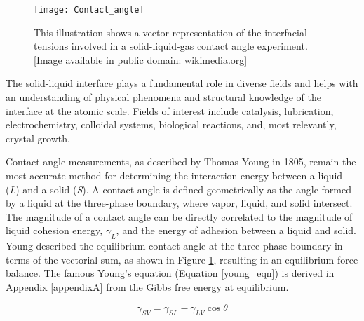  \begin{figure}
 	\centering
 	\texttt{[image: Contact\_angle]}
 	\caption{This illustration shows a vector representation of the interfacial tensions involved in a solid-liquid-gas contact angle experiment. [Image available in public domain: wikimedia.org]}
 	\label{fig:ca-vector}
 \end{figure}



 The solid-liquid interface plays a fundamental role in diverse fields and helps with an understanding of physical phenomena and structural knowledge of the interface at the atomic scale. Fields of interest include catalysis, lubrication, electrochemistry, colloidal systems, biological reactions, and, most relevantly, crystal growth. 

 Contact angle measurements, as described by Thomas Young in 1805, remain the most accurate method for determining the interaction energy between a liquid (\textit{L}) and a solid (\textit{S}). A contact angle is defined geometrically as the angle formed by a liquid at the three-phase boundary, where vapor, liquid, and solid intersect. The magnitude of a contact angle can be directly correlated to the magnitude of liquid cohesion energy, $\gamma_{L}$, and the energy of adhesion between a liquid and solid. Young described the equilibrium contact angle at the three-phase boundary in terms of the vectorial sum, as shown in Figure \ref{fig:ca-vector}, resulting in an equilibrium force balance. The famous Young's equation (Equation \ref{young_eqn}) is derived in Appendix \ref{appendixA} from the Gibbs free energy at equilibrium. 


\hypertarget{youngeqn}{}
\begin{equation}\label{young_eqn}
	\boxed{\gamma_{SV} =\gamma_{SL}-\gamma_{LV}\cos\theta}	
\end{equation}

